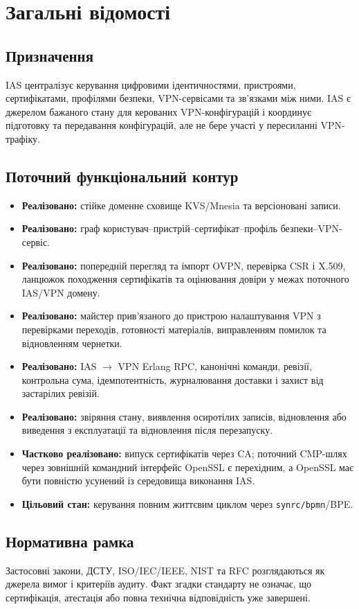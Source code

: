 \documentclass{article}
\begin{document}
\section{Загальні відомості}
\subsection{Призначення}
IAS централізує керування цифровими ідентичностями, пристроями, сертифікатами, профілями безпеки, VPN-сервісами та зв'язками між ними. IAS є джерелом бажаного стану для керованих VPN-конфігурацій і координує підготовку та передавання конфігурацій, але не бере участі у пересиланні VPN-трафіку.

\subsection{Поточний функціональний контур}
\begin{itemize}
  \item \textbf{Реалізовано:} стійке доменне сховище KVS/Mnesia та версіоновані записи.
  \item \textbf{Реалізовано:} граф користувач--пристрій--сертифікат--профіль безпеки--VPN-сервіс.
  \item \textbf{Реалізовано:} попередній перегляд та імпорт OVPN, перевірка CSR і X.509, ланцюжок походження сертифікатів та оцінювання довіри у межах поточного IAS/VPN домену.
  \item \textbf{Реалізовано:} майстер прив’язаного до пристрою налаштування VPN з перевірками переходів, готовності матеріалів, виправленням помилок та відновленням чернетки.
  \item \textbf{Реалізовано:} IAS $\rightarrow$ VPN Erlang RPC, канонічні команди, ревізії, контрольна сума, ідемпотентність, журналювання доставки і захист від застарілих ревізій.
  \item \textbf{Реалізовано:} звіряння стану, виявлення осиротілих записів, відновлення або виведення з експлуатації та відновлення після перезапуску.
  \item \textbf{Частково реалізовано:} випуск сертифікатів через CA; поточний CMP-шлях через зовнішній командний інтерфейс OpenSSL є перехідним, а OpenSSL має бути повністю усунений із середовища виконання IAS.
  \item \textbf{Цільовий стан:} керування повним життєвим циклом через \texttt{synrc/bpmn}/BPE.
\end{itemize}

\subsection{Нормативна рамка}
Застосовні закони, ДСТУ, ISO/IEC/IEEE, NIST та RFC розглядаються як джерела вимог і критеріїв аудиту. Факт згадки стандарту не означає, що сертифікація, атестація або повна технічна відповідність уже завершені.
\end{document}
